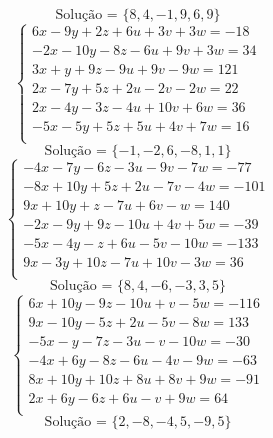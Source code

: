 \documentclass[12pt,oneside,a4paper]{article}
\begin{document}
\begin{equation*}
\text{Solução = }\{8,4,-1,9,6,9\}
\end{equation*}
\vspace{\baselineskip}
\begin{equation*}
\begin{cases}
6x-9y+2z+6u+3v+3w=-18 \\
-2x-10y-8z-6u+9v+3w=34 \\
3x+y+9z-9u+9v-9w=121 \\
2x-7y+5z+2u-2v-2w=22 \\
2x-4y-3z-4u+10v+6w=36 \\
-5x-5y+5z+5u+4v+7w=16 \\
\end{cases}
\end{equation*}
\begin{equation*}
\text{Solução = }\{-1,-2,6,-8,1,1\}
\end{equation*}
\vspace{\baselineskip}
\begin{equation*}
\begin{cases}
-4x-7y-6z-3u-9v-7w=-77 \\
-8x+10y+5z+2u-7v-4w=-101 \\
9x+10y+z-7u+6v-w=140 \\
-2x-9y+9z-10u+4v+5w=-39 \\
-5x-4y-z+6u-5v-10w=-133 \\
9x-3y+10z-7u+10v-3w=36 \\
\end{cases}
\end{equation*}
\begin{equation*}
\text{Solução = }\{8,4,-6,-3,3,5\}
\end{equation*}
\vspace{\baselineskip}
\begin{equation*}
\begin{cases}
6x+10y-9z-10u+v-5w=-116 \\
9x-10y-5z+2u-5v-8w=133 \\
-5x-y-7z-3u-v-10w=-30 \\
-4x+6y-8z-6u-4v-9w=-63 \\
8x+10y+10z+8u+8v+9w=-91 \\
2x+6y-6z+6u-v+9w=64 \\
\end{cases}
\end{equation*}
\begin{equation*}
\text{Solução = }\{2,-8,-4,5,-9,5\}
\end{equation*}
\end{document}
